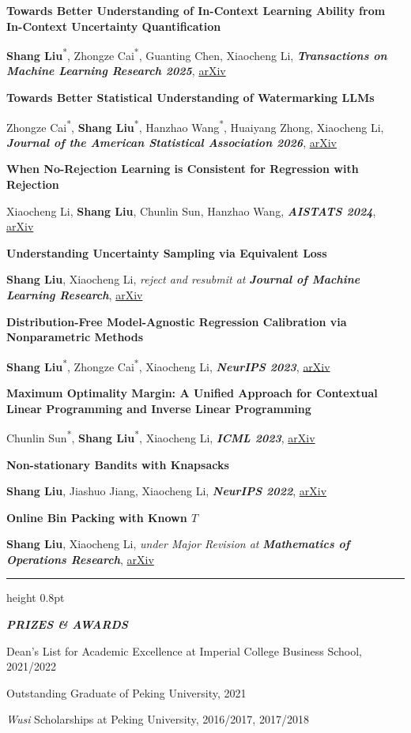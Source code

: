 \documentclass[11pt,letterpaper]{article}
\newcommand{\me}{\textbf{Shang Liu}}
\newcommand{\equalcontrib}{\textsuperscript{*}}
\newcommand{\venue}[1]{\textbf{\textit{#1}}}
\newcommand{\cvsection}[1]{%
  \vspace{8pt}%
  {\color{ruleblue}\hrule height 0.8pt}%
  \vspace{2pt}%
  {\fontsize{15}{17}\selectfont\bfseries\itshape #1}\par
  \vspace{3pt}%
}
\newenvironment{publicationlist}{%
  \begin{list}{}{%
    \setlength{\leftmargin}{0.31in}%
    \setlength{\rightmargin}{0.13in}%
    \setlength{\itemsep}{8pt}%
    \setlength{\topsep}{0pt}%
    \setlength{\parsep}{0pt}%
    \setlength{\partopsep}{0pt}%
  }%
}{\end{list}}
\newcommand{\publication}[3]{%
  \item[]\textbf{#1}\par
  #2, #3\par
}
\begin{document}
\newpage

\begin{publicationlist}
  \publication
    {Towards Better Understanding of In-Context Learning Ability from In-Context Uncertainty Quantification}
    {\me\equalcontrib, Zhongze Cai\equalcontrib, Guanting Chen, Xiaocheng Li}
    {\venue{Transactions on Machine Learning Research 2025}, \href{https://arxiv.org/abs/2405.15115/}{arXiv}}

  \publication
    {Towards Better Statistical Understanding of Watermarking LLMs}
    {Zhongze Cai\equalcontrib, \me\equalcontrib, Hanzhao Wang\equalcontrib, Huaiyang Zhong, Xiaocheng Li}
    {\venue{Journal of the American Statistical Association 2026}, \href{https://arxiv.org/abs/2403.13027/}{arXiv}}

  \publication
    {When No-Rejection Learning is Consistent for Regression with Rejection}
    {Xiaocheng Li, \me, Chunlin Sun, Hanzhao Wang}
    {\venue{AISTATS 2024}, \href{https://arxiv.org/abs/2307.02932/}{arXiv}}

  \publication
    {Understanding Uncertainty Sampling via Equivalent Loss}
    {\me, Xiaocheng Li}
    {\textit{reject and resubmit at }\venue{Journal of Machine Learning Research}, \href{https://arxiv.org/abs/2307.02719/}{arXiv}}

  \publication
    {Distribution-Free Model-Agnostic Regression Calibration via Nonparametric Methods}
    {\me\equalcontrib, Zhongze Cai\equalcontrib, Xiaocheng Li}
    {\venue{NeurIPS 2023}, \href{https://arxiv.org/abs/2305.12283/}{arXiv}}

  \publication
    {Maximum Optimality Margin: A Unified Approach for Contextual Linear Programming and Inverse Linear Programming}
    {Chunlin Sun\equalcontrib, \me\equalcontrib, Xiaocheng Li}
    {\venue{ICML 2023}, \href{https://arxiv.org/abs/2301.11260/}{arXiv}}

  \publication
    {Non-stationary Bandits with Knapsacks}
    {\me, Jiashuo Jiang, Xiaocheng Li}
    {\venue{NeurIPS 2022}, \href{https://arxiv.org/abs/2205.12427/}{arXiv}}

  \publication
    {Online Bin Packing with Known $T$}
    {\me, Xiaocheng Li}
    {\textit{under Major Revision at }\venue{Mathematics of Operations Research}, \href{https://arxiv.org/abs/2112.03200/}{arXiv}}
\end{publicationlist}

\cvsection{PRIZES \& AWARDS}

\begin{list}{}{\setlength{\leftmargin}{0.40in}\setlength{\rightmargin}{0.15in}\setlength{\topsep}{0pt}\setlength{\itemsep}{1pt}}
  \item[] Dean's List for Academic Excellence at Imperial College Business School, 2021/2022
  \item[] Outstanding Graduate of Peking University, 2021
  \item[] \textit{Wusi} Scholarships at Peking University, 2016/2017, 2017/2018
\end{list}
\end{document}
